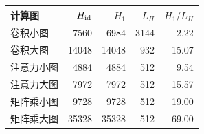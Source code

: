 \begin{tabular}{lrrrr}\toprule
计算图 & $H_{\rm id}$ & $H_1$ & $L_H$ & $H_1/L_H$\\\midrule
卷积小图 & 7560 & 6984 & 3144 & 2.22\\
卷积大图 & 14048 & 14048 & 932 & 15.07\\
注意力小图 & 4884 & 4884 & 512 & 9.54\\
注意力大图 & 7972 & 7972 & 512 & 15.57\\
矩阵乘小图 & 9728 & 9728 & 512 & 19.00\\
矩阵乘大图 & 35328 & 35328 & 512 & 69.00\\
\bottomrule\end{tabular}
